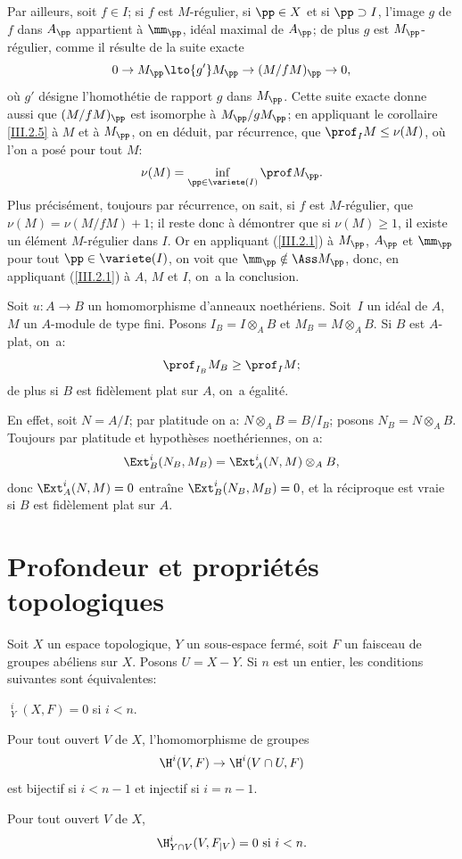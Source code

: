 Par ailleurs, soit $f\in I$; si $f$ est $M$-r\'egulier, si $\pp\in X$ et si $\pp\supset I$, l'image $g$ de $f$ dans $A_\pp$ appartient \`a $\mm_\pp$, id\'eal maximal de $A_\pp$; de plus $g$ est $M_\pp$-r\'egulier, comme il r\'esulte de la suite exacte
\begin{equation} \label{eq:III.2.3} 0 \to M_\pp \lto{g'} M_\pp \to (M/fM)_\pp \to 0,
\end{equation}
o\`u $g'$ d\'esigne l'homoth\'etie de rapport $g$ dans $M_\pp$. Cette suite exacte donne aussi que $(M/fM)_\pp$ est isomorphe \`a $M_\pp/gM_\pp$; en appliquant le corollaire \ref{III.2.5} \`a $M$ et \`a $M_\pp$, on en d\'eduit, par r\'ecurrence, que $\prof_I M\leq \nu(M)$, o\`u l'on a pos\'e pour tout $M$:
\[
\nu(M)=\inf_{\pp\in\variete(I)} \prof M_\pp.
\]
Plus pr\'ecis\'ement, toujours par r\'ecurrence, on sait, si $f$ est $M$-r\'egulier, que $\nu(M)= \nu(M/fM)+1$; il reste donc \`a d\'emontrer que si $\nu(M)\geq 1$, il existe un \'el\'ement $M$-r\'egulier dans $I$. Or en appliquant (\ref{III.2.1}) \`a $M_\pp$, $A_\pp$ et $\mm_\pp$ pour tout $\pp\in \variete(I)$, on voit que $\mm_\pp \notin \Ass M_\pp$, donc, en appliquant (\ref{III.2.1}) \`a $A$, $M$ et $I$, on~a la conclusion.

\enlargethispage{\baselineskip}%
\begin{proposition} \label{III.2.11}
Soit $u:A\to B$ un homomorphisme d'anneaux noeth\'eriens. Soit~$I$ un id\'eal de $A$, $M$ un $A$-module de type fini. Posons $I_B=I\otimes_A B$ et $M_B=M\otimes_A B$. Si $B$ est $A$-plat, on~a:
\[
\prof_{I_B} M_B \geq \prof_I M;
\]
de plus si $B$ est fid\`element plat sur $A$, on~a \'egalit\'e.
\end{proposition}

En effet, soit $N=A/I$; par platitude on a: $N\otimes_A B=B/I_B$; posons $N_B=N\otimes_A B$. Toujours par platitude et hypoth\`eses noeth\'eriennes, on a:
\[
\Ext_B^i (N_B, M_B) = \Ext_A^i(N, M)\otimes_A B,
\]
donc $\Ext_A^i(N, M) = 0 $ entra\^ine $\Ext_B^i(N_B, M_B)=0$, et la r\'eciproque est vraie si $B$ est fid\`element plat sur $A$.

\section{Profondeur et propri\'et\'es topologiques} \label{III.3}

\begin{lemme} \label{III.3.1}
Soit $X$ un espace topologique, $Y$ un sous-espace ferm\'e, soit $F$ un faisceau de groupes ab\'eliens sur $X$. Posons $U=X- Y$. Si $n$ est un entier, les conditions suivantes sont \'equivalentes:
\begin{enumeratei}
\item
$\mathop{\underline{\mathrm{H}}}\nolimits_Y^i (X, F)=0$ si $i<n$.
\item
Pour tout ouvert $V$ de $X$, l'homomorphisme de groupes
\[
\H^i(V, F) \to \H^i(V\cap U, F)
\]
est bijectif si $i<n-1$ et injectif si $i=n-1$.

\item
Pour tout ouvert $V$ de $X$,
\[
\H_{Y\cap V}^i(V, F_{\mid V})=0 \text{ si } i<n.
\]
\end{enumeratei}
\end{lemme}

